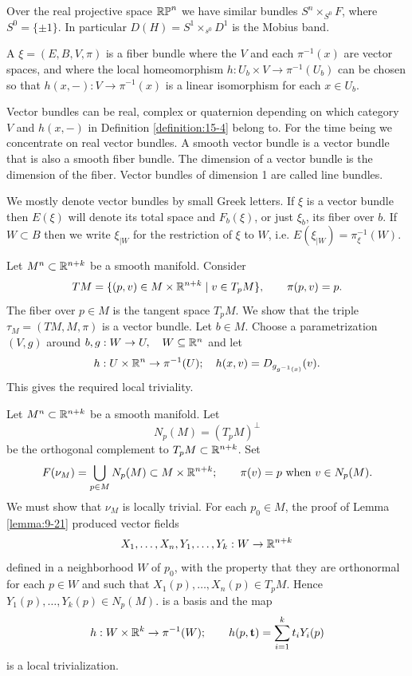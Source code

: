 \begin{example}\label{example:15-3}
  Over the real projective space $\mathbb{RP}^n$ we have similar bundles
  $S^n\times_{S^0} F$, where $S^0 = \{\pm1\}$. In particular $D(H) = S^1\times_{s^0} D^1$ is 
  the Mobius band.
\end{example}

\begin{definition}\label{definition:15-4}
  A  $\xi = (E, B, V, \pi)$ is a fiber bundle where the
   $V$ and each $\pi^{-1}(x)$ are vector spaces, and where the local 
  homeomorphism $h:U_b\times V\to\pi^{-1}(U_b)$ can be chosen so that $h(x, -):V\to\pi^{-1}(x)$ is
  a linear isomorphism for each $x\in U_b$.
\end{definition}

Vector bundles can be real, complex or quaternion depending on which category
$V$ and $h(x, -)$ in Definition \ref{definition:15-4} belong to. For the time being we concentrate
on real vector bundles. A smooth vector bundle is a vector bundle that is also a
smooth fiber bundle. The dimension of a vector bundle is the dimension of the
fiber. Vector bundles of dimension 1 are called line bundles.


We mostly denote vector bundles by small Greek letters. If $\xi$ is a vector bundle
then $E(\xi)$ will denote its total space and $F_b(\xi)$, or just $\xi_b$, its fiber over $b$. If
$W\subset B$ then we write $\xi_{|W}$ for the restriction of $\xi$ to $W$, i.e. $E(\xi_{|W})=\pi^{-1}_\xi(W)$.

\begin{example}\label{example:15-5}
  Let $M^n\subset{\ensuremath{\mathbb{R}}}^{n+k}$ be a smooth manifold. Consider 
  \[
    TM = \{(p, v)\in M\times{\ensuremath{\mathbb{R}}}^{n+k} \mid v\in T_pM\},\qquad \pi(p, v) = p.
  \]
  The fiber over $p\in M$ is the tangent space $T_pM$. We show that the triple
  $\tau_M = (TM, M, \pi)$ is a vector bundle. Let $b\in M$. Choose a parametrization
  $(V, g)$ around $b,g:W\to U,\quad W\subseteq{\ensuremath{\mathbb{R}}}^n$ and let
  \[
    h:U\times{\ensuremath{\mathbb{R}}}^n\to\pi^{-1}(U);\quad h(x, v) = D_{g_{g^{-1}(x)}}(v).
  \]
  This gives the required local triviality.
\end{example}

\begin{example}\label{example:15-6}
  Let $M^n\subset{\ensuremath{\mathbb{R}}}^{n+k}$ be a smooth manifold. Let 
  \[
    N_p(M) = (T_pM)^\perp
  \]
  be the orthogonal complement to $T_pM\subset{\ensuremath{\mathbb{R}}}^{n+k}$. Set 
  \[
    F(\nu_M) = \bigcup_{p\in M} N_p(M)\subset M\times{\ensuremath{\mathbb{R}}}^{n+k}; \qquad \pi(v) = p\text{ when } v\in N_p(M).
  \]
  We must show that $\nu_M$ is locally trivial. For each $p_0\in M$, the proof of Lemma \ref{lemma:9-21} 
  produced vector fields
  \[
    X_1, \ldots, X_n, Y_1, \ldots, Y_k:W\to{\ensuremath{\mathbb{R}}}^{n+k}
  \]
  defined in a neighborhood $W$ of $p_0$, with the property that they are orthonormal for
  each $p\in W$ and such that $X_1(p), \ldots, X_n(p)\in T_pM$. Hence $Y_1(p), \ldots, Y_k(p)\in N_p(M)$.
  is a basis and the map
  \[
    h:W\times{\ensuremath{\mathbb{R}}}^k\to\pi^{-1}(W);\qquad h(p, \mathbf{t}) = \sum_{i=1 }^{k}{t_iY_i(p)}
  \]
  is a local trivialization.
\end{example}

